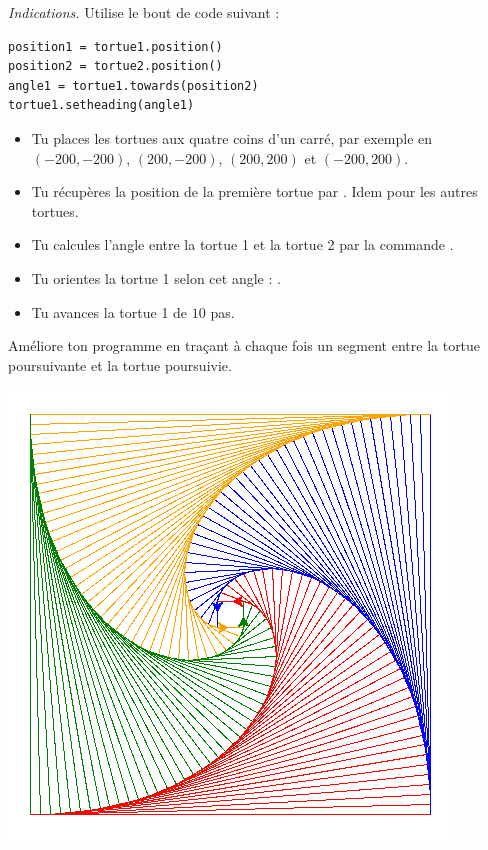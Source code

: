 \documentclass[11pt,class=report,crop=false]{standalone}
\begin{document}
\begin{activite}
\emph{Indications.}
Utilise le bout de code suivant :
\begin{center}
\begin{minipage}{0.5\textwidth}
\begin{lstlisting}
position1 = tortue1.position()
position2 = tortue2.position()
angle1 = tortue1.towards(position2)
tortue1.setheading(angle1)
\end{lstlisting}
\end{minipage}
\end{center}
\begin{itemize}
  \item Tu places les tortues aux quatre coins d'un carré, par exemple en $(-200,-200)$,
  $(200,-200)$, $(200,200)$ et $(-200,200)$.
  \item Tu récupères la position de la première tortue  par 
  .
  Idem pour les autres tortues.
  \item Tu calcules l'angle entre la tortue 1 et la tortue 2 par la commande
  .
  \item Tu orientes la tortue 1 selon cet angle :
  .
  \item Tu avances la tortue 1 de $10$ pas.
\end{itemize}

Améliore ton programme en traçant à chaque fois un segment entre la tortue poursuivante et la tortue poursuivie.

\begin{center}
\includegraphics[scale=0.5]{ecran-tortue-6b}
\end{center}  
\end{activite}
\end{document}

